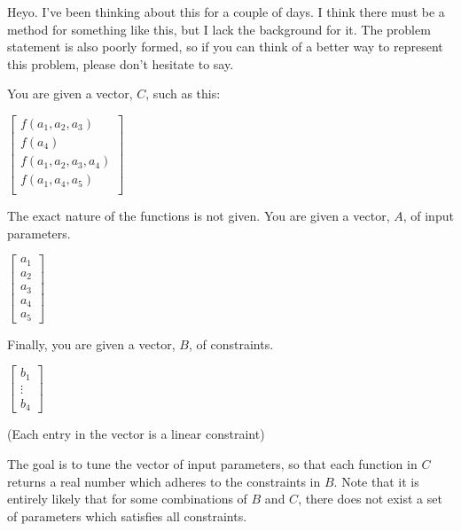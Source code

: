 \documentclass[11pt]{article}
\begin{document}
Heyo. I've been thinking about this for a couple of days. I think there must be
a method for something like this, but I lack the background for it. The problem
statement is also poorly formed, so if you can think of a better way to
represent this problem, please don't hesitate to say.

You are given a vector, $C$, such as this: \\

\begin{center}
  \begin{math}
    \begin{bmatrix}
      f(a_1, a_2, a_3) \\
      f(a_4) \\
      f(a_1, a_2, a_3, a_4) \\
      f(a_1, a_4, a_5) \\
    \end{bmatrix}
  \end{math}
\end{center}

The exact nature of the functions is not given. You are given a vector,
$A$, of input parameters. \\
\begin{center}
  \begin{math}
    \begin{bmatrix}
      a_1 \\ a_2 \\ a_3 \\ a_4 \\ a_5
    \end{bmatrix}
  \end{math}
\end{center}

Finally, you are given a vector, $B$, of constraints. \\
\begin{center}
  \begin{math}
    \begin{bmatrix}
      b_1 \\ \vdots \\ b_4
    \end{bmatrix}
  \end{math}
\end{center}
(Each entry in the vector is a linear constraint)

The goal is to tune the vector of input parameters, so that each function in $C$
returns a real number which adheres to the constraints in $B$. Note that it is
entirely likely that for some combinations of $B$ and $C$, there does not exist
a set of parameters which satisfies all constraints.
\end{document}
